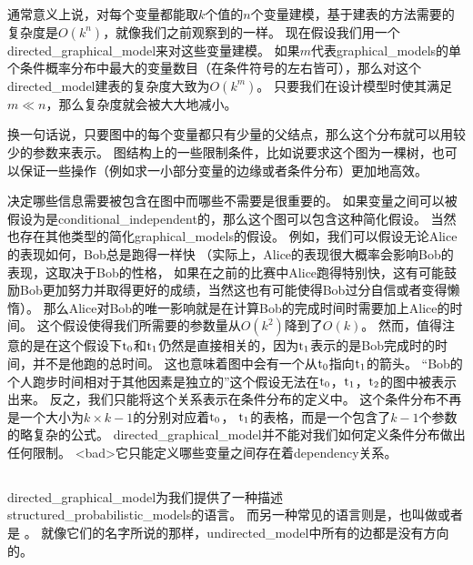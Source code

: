 通常意义上说，对每个变量都能取$k$个值的$n$个变量建模，基于建表的方法需要的复杂度是$O(k^n)$，就像我们之前观察到的一样。
现在假设我们用一个\gls{directed_graphical_model}来对这些变量建模。
如果$m$代表\gls{graphical_models}的单个条件概率分布中最大的变量数目（在条件符号的左右皆可），那么对这个\gls{directed_model}建表的复杂度大致为$O(k^m)$。
只要我们在设计模型时使其满足$m\ll n$，那么复杂度就会被大大地减小。


换一句话说，只要图中的每个变量都只有少量的父结点，那么这个分布就可以用较少的参数来表示。
图结构上的一些限制条件，比如说要求这个图为一棵树，也可以保证一些操作（例如求一小部分变量的边缘或者条件分布）更加地高效。



决定哪些信息需要被包含在图中而哪些不需要是很重要的。
如果变量之间可以被假设为是\gls{conditional_independent}的，那么这个图可以包含这种简化假设。
当然也存在其他类型的简化\gls{graphical_models}的假设。
例如，我们可以假设无论Alice的表现如何，Bob总是跑得一样快
（实际上，Alice的表现很大概率会影响Bob的表现，这取决于Bob的性格，
如果在之前的比赛中Alice跑得特别快，这有可能鼓励Bob更加努力并取得更好的成绩，当然这也有可能使得Bob过分自信或者变得懒惰）。
那么Alice对Bob的唯一影响就是在计算Bob的完成时间时需要加上Alice的时间。
这个假设使得我们所需要的参数量从$O(k^2)$降到了$O(k)$。
然而，值得注意的是在这个假设下$\mathrm{t}_0$和$\mathrm{t}_1$仍然是直接相关的，因为$\mathrm{t}_1$表示的是Bob完成时的时间，并不是他跑的总时间。
这也意味着图中会有一个从$\mathrm{t}_0$指向$\mathrm{t}_1$的箭头。
``Bob的个人跑步时间相对于其他因素是独立的''这个假设无法在$\mathrm{t}_0$，$\mathrm{t}_1$，$\mathrm{t}_2$的图中被表示出来。
反之，我们只能将这个关系表示在条件分布的定义中。
这个条件分布不再是一个大小为$k\times k-1$的分别对应着$\mathrm{t}_0$，  $\mathrm{t}_1$的表格，而是一个包含了$k-1$个参数的略复杂的公式。
\gls{directed_graphical_model}并不能对我们如何定义条件分布做出任何限制。
<bad>它只能定义哪些变量之间存在着\gls{dependency}关系。



\subsection{}
\label{sec:undirected_models}


\gls{directed_graphical_model}为我们提供了一种描述\gls{structured_probabilistic_models}的语言。
而另一种常见的语言则是，也叫做或者是 \citep{kindermann-book-1980}。
就像它们的名字所说的那样，\gls{undirected_model}中所有的边都是没有方向的。


